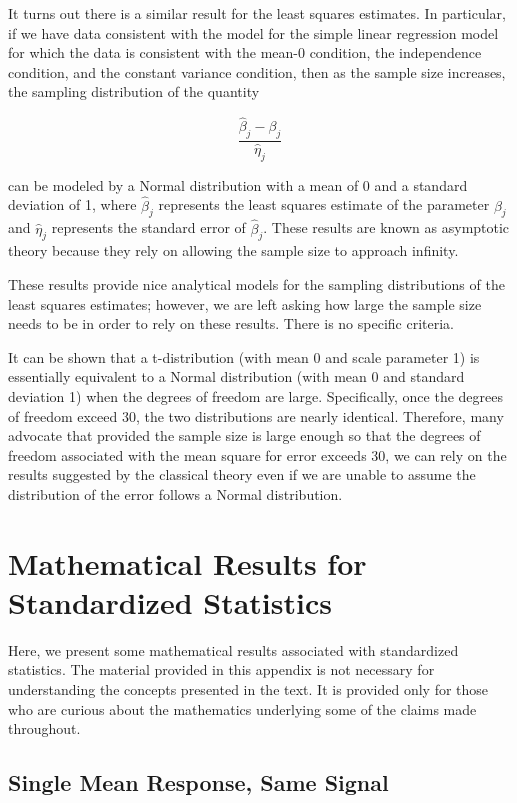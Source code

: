 \documentclass[
  letterpaper,
  DIV=11,
  numbers=noendperiod]{scrreprt}
\theoremstyle{plain}
\theoremstyle{definition}
\theoremstyle{definition}
\theoremstyle{remark}
\begin{document}
It turns out there is a similar result for the least squares estimates.
In particular, if we have data consistent with the model for the simple
linear regression model for which the data is consistent with the mean-0
condition, the independence condition, and the constant variance
condition, then as the sample size increases, the sampling distribution
of the quantity

\[\frac{\widehat{\beta}_j - \beta_j}{\widehat{\eta}_j}\]

can be modeled by a Normal distribution with a mean of 0 and a standard
deviation of 1, where \(\widehat{\beta}_j\) represents the least squares
estimate of the parameter \(\beta_j\) and \(\widehat{\eta}_j\)
represents the standard error of \(\widehat{\beta}_j\). These results
are known as asymptotic theory because they rely on allowing the sample
size to approach infinity.

These results provide nice analytical models for the sampling
distributions of the least squares estimates; however, we are left
asking how large the sample size needs to be in order to rely on these
results. There is no specific criteria.

It can be shown that a t-distribution (with mean 0 and scale parameter
1) is essentially equivalent to a Normal distribution (with mean 0 and
standard deviation 1) when the degrees of freedom are large.
Specifically, once the degrees of freedom exceed 30, the two
distributions are nearly identical. Therefore, many advocate that
provided the sample size is large enough so that the degrees of freedom
associated with the mean square for error exceeds 30, we can rely on the
results suggested by the classical theory even if we are unable to
assume the distribution of the error follows a Normal distribution.

\chapter{Mathematical Results for Standardized
Statistics}\label{sec-app-teststat}

Here, we present some mathematical results associated with standardized
statistics. The material provided in this appendix is not necessary for
understanding the concepts presented in the text. It is provided only
for those who are curious about the mathematics underlying some of the
claims made throughout.

\section{Single Mean Response, Same
Signal}\label{single-mean-response-same-signal}
\end{document}
